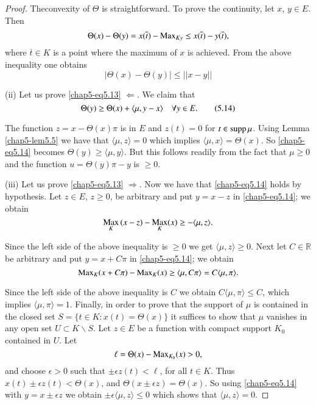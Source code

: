 \begin{proof}
The\pageoriginale convexity of $\Theta$ is straightforward. To prove
the continuity, let $x$, $y\in E$. Then
$$
\Theta(x)-\Theta(y)=x(\overline{t})-\operatorname{Max}_{K y}\leq
x(\overline{t})-y(\overline{t}), 
$$
where $\overline{t}\in K$ is a point where the maximum of $x$ is
achieved. From the above inequality one obtains
$$
|\Theta(x)-\Theta(y)|\leq ||x-y||
$$

(ii) Let us prove \eqref{chap5-eq5.13} $\Leftarrow$. We claim that
\begin{equation*}
\Theta(y)\geq \Theta(x)+\langle \mu,y-x\rangle\quad \forall y\in
E.\tag{5.14}\label{chap5-eq5.14} 
\end{equation*}

The function $z=x-\Theta(x)\pi$ is in $E$ and $z(t)=0$ for $t\in \operatorname{supp}
\mu$. Using Lemma \ref{chap5-lem5.5} we have that $\langle
\mu,z\rangle=0$ which implies $\langle \mu,x\rangle=\Theta(x)$. So
\eqref{chap5-eq5.14} becomes $\Theta(y)\geq \langle \mu,y\rangle$. But
this follows readily from the fact that $\mu\geq 0$ and the function
$u=\Theta(y)\pi-y$ is $\geq 0$. 

(iii) Let us prove \eqref{chap5-eq5.13} $\Rightarrow$. Now we have
that \eqref{chap5-eq5.14} holds by hypothesis. Let $z\in E$, $z\geq
0$, be arbitrary and put $y=x-z$ in \eqref{chap5-eq5.14}; we obtain
$$
{\displaystyle{\mathop{\operatorname{Max}}_{K}}}\,(x-z)-{\displaystyle{\mathop{\operatorname{Max}}_{K}}}(x)\geq -\langle \mu,z\rangle.
$$

Since the left side of the above inequality is $\geq 0$ we get
$\langle \mu,z\rangle\geq 0$. Next let $C\in \mathbb{R}$ be arbitrary
and put $y=x+C\pi$ in \eqref{chap5-eq5.14}; we obtain
$$
\operatorname{Max}_{K}(x+C\pi)-\operatorname{Max}_{K}(x)\geq \langle \mu,C\pi\rangle=C\langle
\mu,\pi\rangle. 
$$

Since the left side of the above inequality is $C$ we obtain $C\langle
\mu,\pi\rangle \leq C$, which implies $\langle \mu,\pi\rangle
=1$. Finally, in order to prove that the support of $\mu$ is contained
in the closed set $S=\{t\in K:x(t)=\Theta(x)\}$ it suffices to show
that $\mu$ vanishes in any open set $U\subset K\backslash S$. Let
$z\in E$ be a function with compact support $K_{0}$ contained in
$U$. Let
$$
\ell=\Theta(x)-\operatorname{Max}_{K_{0}}(x)>0,
$$
and choose $\epsilon>0$ such that $\pm \epsilon z(t)<\ell$, for all
$t\in K$. Thus $x(t)\pm \epsilon z(t)<\Theta(x)$, and $\Theta(x\pm
\epsilon z)=\Theta(x)$. So using \eqref{chap5-eq5.14} with $y=x\pm
\epsilon z$ we obtain $\pm \epsilon \langle\mu,z\rangle\leq 0$ which
shows that $\langle \mu,z\rangle=0$.
\end{proof}

